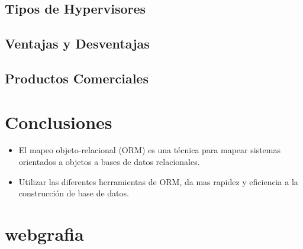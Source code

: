 \documentclass[%
 reprint,
 amsmath,amssymb,
 aps,
]{revtex4-1}
\begin{document}
\subsection{Tipos de Hypervisores}
\subsection{Ventajas y Desventajas}
\subsection{Productos Comerciales}

\section{Conclusiones}\label{sec:8}


\begin{itemize}
	\item El mapeo objeto-relacional (ORM) es una técnica para mapear sistemas orientados a objetos a bases de datos relacionales.
	\item Utilizar las diferentes herramientas de ORM, da mas rapidez y eficiencia a la construcción de base de datos.
\end{itemize}

\section{webgrafia}\label{sec:9}



\end{document}
